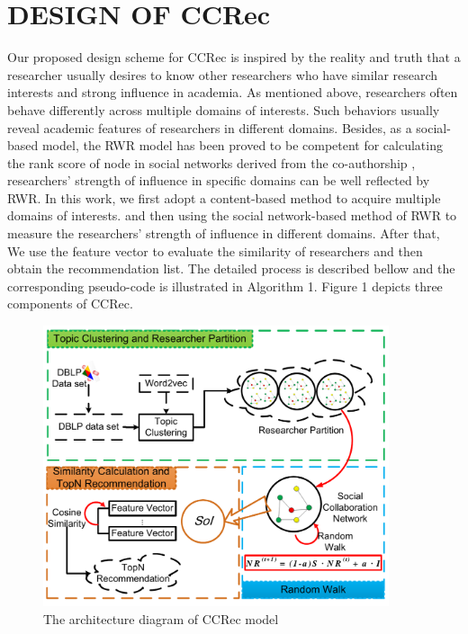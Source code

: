 \documentclass[review]{elsarticle}
\begin{document}
\section{DESIGN OF CCRec}
Our proposed design scheme for CCRec is inspired by the reality and truth that a researcher usually desires to know other researchers who have similar research interests and strong influence in academia. As mentioned above, researchers often behave differently across multiple domains of interests. Such behaviors usually reveal academic features of researchers in different domains. Besides, as a social-based model, the RWR model has been proved to be competent for calculating the rank score of node in social networks derived from the co-authorship \cite{li2014acrec}, researchers' strength of influence in specific domains can be well reflected by RWR. In this work, we first adopt a content-based method to acquire multiple domains of interests. and then using the social network-based method of RWR to measure the researchers' strength of influence in different domains. After that, We use the feature vector to evaluate the similarity of researchers and then obtain the recommendation list. The detailed process is described bellow and the corresponding pseudo-code is illustrated in Algorithm 1. Figure 1 depicts three components of CCRec.


\begin{figure}
\centering
\includegraphics [width=4in]{Fig1.pdf}
\caption{The architecture diagram of CCRec model}
\end{figure}
\end{document}
